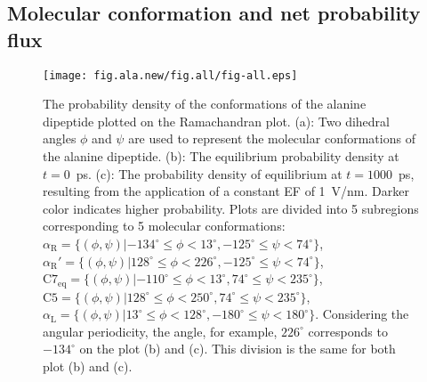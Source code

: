 \documentclass[a4paper,preprint,unsortedaddress,onecolumn]{revtex4-1}
\newcommand{\confaa}[0]{{\alpha_{\textrm{R}}}}
\newcommand{\confab}[0]{{\alpha_{\textrm{R}}'}}
\newcommand{\confba}[0]{{\textrm{C}7_{\textrm{eq}}}}
\newcommand{\confbb}[0]{{\textrm{C}5}}
\newcommand{\confc}[0]{{\alpha_{\textrm{L}}}}
\begin{document}
\subsection{Molecular conformation and net probability flux}

\begin{figure}
  \centering
  \texttt{[image: fig.ala.new/fig.all/fig-all.eps]}
  \caption{
    The probability density of the conformations of the alanine dipeptide plotted on the Ramachandran plot.
    (a): Two dihedral angles
    $\phi$ and $\psi$ are used to represent the molecular conformations of the alanine dipeptide.
    (b): The equilibrium probability density 
    at $t=0$~\textsf{ps}. (c): The probability density of equilibrium at $t=1000$~\textsf{ps}, resulting from the application of a constant EF of 1~V/nm. Darker color
    indicates higher probability.
    Plots are divided into 5 subregions corresponding
    to 5 molecular conformations:
    $\confaa = \{(\phi, \psi) | -134^\circ \leq \phi <  13^\circ, -125^\circ \leq \psi < 74^\circ\}$,
    $\confab = \{(\phi, \psi) |  128^\circ \leq \phi < 226^\circ, -125^\circ \leq \psi < 74^\circ\}$,
    $\confba = \{(\phi, \psi) | -110^\circ \leq \phi <  13^\circ,   74^\circ \leq \psi < 235^\circ\}$,
    $\confbb = \{(\phi, \psi) |  128^\circ \leq \phi < 250^\circ,   74^\circ \leq \psi < 235^\circ\}$,
    $\confc   = \{(\phi, \psi) |   13^\circ \leq \phi < 128^\circ, -180^\circ \leq \psi < 180^\circ\}$.
    Considering the angular periodicity, the angle, for example, $226^\circ$ corresponds to $-134^\circ$
    on the plot (b) and (c).
    This division is the same for both plot (b) and (c).
  }
  \label{fig:tmp4}
\end{figure}
\end{document}
